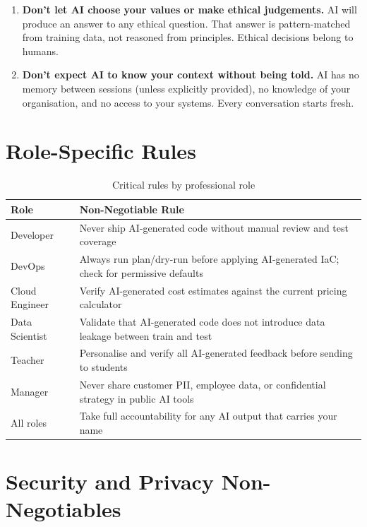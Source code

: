 \begin{enumerate}
  \item \textbf{Don't let AI choose your values or make ethical judgements.}
    AI will produce an answer to any ethical question. That answer is pattern-matched
    from training data, not reasoned from principles. Ethical decisions belong to humans.

  \item \textbf{Don't expect AI to know your context without being told.}
    AI has no memory between sessions (unless explicitly provided), no knowledge of
    your organisation, and no access to your systems. Every conversation starts fresh.

\end{enumerate}

\section{Role-Specific Rules}
\label{sec:role-rules}

\begin{table}[htbp]
\centering
\caption{Critical rules by professional role}
\begin{tabularx}{\linewidth}{l X}
\toprule
\textbf{Role} & \textbf{Non-Negotiable Rule} \\
\midrule
Developer      & Never ship AI-generated code without manual review and test coverage \\[4pt]
DevOps         & Always run plan/dry-run before applying AI-generated IaC; check for permissive defaults \\[4pt]
Cloud Engineer & Verify AI-generated cost estimates against the current pricing calculator \\[4pt]
Data Scientist & Validate that AI-generated code does not introduce data leakage between train and test \\[4pt]
Teacher        & Personalise and verify all AI-generated feedback before sending to students \\[4pt]
Manager        & Never share customer PII, employee data, or confidential strategy in public AI tools \\[4pt]
All roles      & Take full accountability for any AI output that carries your name \\
\bottomrule
\end{tabularx}
\label{tab:role-rules}
\end{table}

\section{Security and Privacy Non-Negotiables}
\label{sec:security-privacy}

